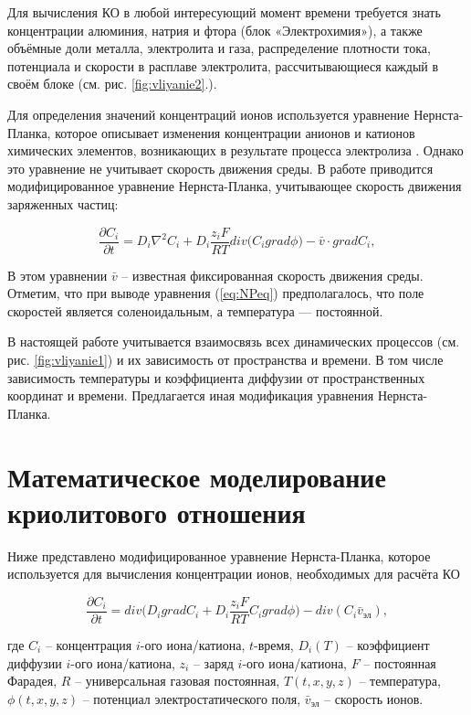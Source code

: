 \documentclass[pdflatex,sn-mathphys-gost]{pmi-jnl}
\begin{document}
Для вычисления КО в любой интересующий момент времени требуется знать концентрации алюминия, натрия и фтора (блок «Электрохимия»), а также объёмные доли металла, электролита и газа, распределение плотности тока, потенциала и скорости в расплаве электролита, рассчитывающиеся каждый в своём блоке (см. рис. \ref{fig:vliyanie2}.).

Для определения значений концентраций ионов используется уравнение Нернста-Планка, которое описывает изменения концентрации анионов и катионов химических элементов, возникающих в результате процесса электролиза \cite{litlink:burger}. Однако это уравнение не учитывает скорость движения среды. В работе \cite{litlink:damaskin} приводится модифицированное уравнение Нернста-Планка, учитывающее скорость движения заряженных частиц:

\begin{equation}\label{eq:NPeq}
	\frac{\partial C_i}{\partial t} = D_i\nabla^{2}C_i+D_i\frac{z_iF}{RT}div\big(C_i grad\phi\big) - \bar{v} \cdot gradC_i,
\end{equation}

В этом уравнении $\bar{v}$ – известная фиксированная скорость движения среды. Отметим, что при выводе уравнения (\ref{eq:NPeq}) предполагалось, что поле скоростей является соленоидальным, а температура --- постоянной.

В настоящей работе учитывается взаимосвязь всех динамических процессов (см. рис. \ref{fig:vliyanie1}) и их зависимость от пространства и времени. В том числе зависимость температуры и коэффициента диффузии от пространственных координат и времени. Предлагается иная модификация уравнения Нернста-Планка.

\section{Математическое моделирование криолитового отношения}

Ниже представлено модифицированное уравнение Нернста-Планка, которое используется для вычисления концентрации ионов, необходимых для расчёта КО

\begin{equation}\label{eq:NPeqmod}
	\frac{\partial C_i}{\partial t} = div\bigg(D_i gradC_i + D_i \frac{z_iF}{RT}C_igrad\phi\bigg) - div(C_i \bar{v}_{\text{эл}}),
\end{equation}

где $C_i$ – концентрация $i$-ого иона/катиона, $t$-время, $D_i (T)$ – коэффициент диффузии $i$-ого иона/катиона, $z_i$ – заряд $i$-ого иона/катиона, $F$ – постоянная Фарадея, $R$ – универсальная газовая постоянная, $T(t,x,y,z)$ – температура, $\phi (t,x,y,z)$ – потенциал электростатического поля, $\bar{v}_\text{эл}$ – скорость ионов.
\end{document}
